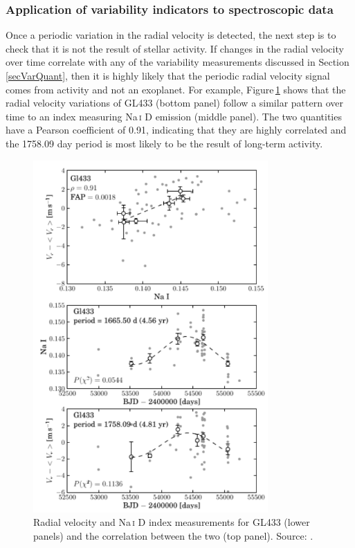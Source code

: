 \subsubsection{Application of variability indicators to spectroscopic data}
\label{secVarApp}
Once a periodic variation in the radial velocity is detected, the next step is to check that it is not the result of stellar activity. If changes in the radial velocity over time correlate with any of the variability measurements discussed in Section\,\ref{secVarQuant}, then it is highly likely that the periodic radial velocity signal comes from activity and not an exoplanet. For example, Figure\,\ref{figGL433_activity} shows that the radial velocity variations of GL433 (bottom panel) follow a similar pattern over time to an index measuring Na\,\textsc{i} D emission (middle panel). The two quantities have a Pearson coefficient of 0.91, indicating that they are highly correlated and the 1758.09 day period is most likely to be the result of long-term activity.\\

\begin{figure}
    \includegraphics[width=0.8\textwidth]{Gl433_activity.pdf}
    \caption{Radial velocity and Na\,\textsc{i} D index measurements for GL433 (lower panels) and the correlation between the two (top panel). Source: \citet{2012Gomes}.}
    \label{figGL433_activity}
\end{figure}

